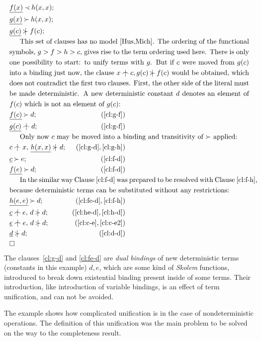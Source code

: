 \begin{example} \label {famous}
\begin{eqnarray}
\label{cl:f-h}  &\underline{f(x)}\Incl h(x,x); \\
\label{cl:g-h}  &\underline{g(x)}\Cont h(x,x);\\
\label{cl:g-f}  &\underline{g(c)}\notCont f(c);\\
\noalign
{This set of clauses has no model \cite{Hus,Mich}.  The ordering of 
the functional symbols, $g>f>h>c$, gives rise to the term ordering used here.
There is only one possibility to start: to unify terms with
$g$. But if $c$ were moved from $g(c)$ into a binding just now, the clause
\(x\notInt c, g(c)\notCont f(c)\) would be obtained, which does not
contradict the first two clauses.  First, the other side of the literal
must be made deterministic. A new deterministic constant $d$ denotes an element
of $f(c)$ which is not an element of $g(c)$:}
\label{cl:f-d}  &\underline{f(c)}\Cont d; &  (\ref {cl:g-f})\\
\label{cl:g-d}  &\underline{g(c)}\notInt d; &  (\ref {cl:g-f})\\
\noalign{Only now $c$ may be moved into a binding and transitivity of 
$\Cont$ applied:}
\label{cl:h-d}  & c\notInt x,\,\underline{h(x,x)}\notCont d; &  (\ref{cl:g-d},\ref{cl:g-h})\\
\label{cl:c-e}   &\underline c\Cont e; &  (\ref {cl:f-d})\\
\label{cl:fe-d}   &\underline{f(e)}\Cont d; &  (\ref {cl:f-d})\\
\noalign{In the similar way Clause~\ref {cl:f-d} was prepared to be resolved
with Clause~\ref {cl:f-h}, because deterministic terms can be substituted
without any restrictions:}
\label{cl:he-d}  &\underline{h(e,e)}\Cont d; &  (\ref {cl:fe-d},\ref{cl:f-h})\\
\label{cl:c-e2}  & \underline c\notInt e,\, d\notCont d; &  (\ref {cl:he-d},\ref{cl:h-d})\\
\label{cl:d-d}   & \underline e\notInt e,\,d\notCont d; &  (\ref {cl:c-e},\ref{cl:c-e2})\\
&\underline{d}\notCont d; &  (\ref {cl:d-d})\\
& \Box
\end{eqnarray}
The clauses~\ref {cl:g-d} and \ref{cl:fe-d} are {\em dual bindings} of new
deterministic terms (constants in this example) $d,e$, which are some kind of
{\em Skolem} functions, introduced to break down existential binding present
inside of some terms.  Their introduction, like introduction of variable
bindings, is an effect of term unification, and can not be avoided.
\end{example}
%
The example shows how complicated unification is in the case of
nondeterministic operations.  The definition of this unification was the
main problem to be solved on the way to the completeness result.

